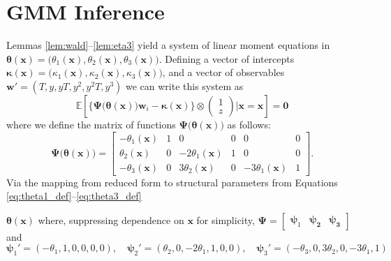 \section{GMM Inference}
\label{sec:inference}

Lemmas \ref{lem:wald}--\ref{lem:eta3} yield a system of linear moment equations in $\boldsymbol{\theta}(\mathbf{x}) = \big(\theta_1(\mathbf{x}), \theta_2(\mathbf{x}),\theta_3(\mathbf{x})\big)$.
Defining a vector of intercepts $\boldsymbol{\kappa}(\mathbf{x}) = \big(\kappa_1(\mathbf{x}), \kappa_2(\mathbf{x}), \kappa_3(\mathbf{x})\big)$,
and a vector of observables $\mathbf{w}' = (T, y, yT, y^2, y^2 T, y^3)$ we can write this system as
\begin{equation}
\mathbb{E}\left[
  \bigg\{\boldsymbol{\Psi}\big(\boldsymbol{\theta}(\mathbf{x})\big)\mathbf{w}_i - \boldsymbol{\kappa}(\mathbf{x})\bigg\} \otimes 
\left(
\begin{array}{c}
  1 \\ z
\end{array}\right)\Bigg| \mathbf{x} = \boldsymbol{x}
\right] = \mathbf{0}
\label{eq:MCs_endog}
\end{equation}
where we define the matrix of functions $\boldsymbol{\Psi}\big(\boldsymbol{\theta}(\mathbf{x})\big)$ as follows:
\[
  \boldsymbol{\Psi}\big(\boldsymbol{\theta}(\mathbf{x})\big) = 
  \left[
  \begin{array}{rrrrrr}
    -\theta_1(\mathbf{x}) & 1 & 0 & 0 & 0 & 0\\
    \theta_2(\mathbf{x}) & 0 & -2\theta_1(\mathbf{x}) & 1 & 0 & 0\\ 
    -\theta_3(\mathbf{x}) & 0 & 3\theta_2(\mathbf{x}) & 0 & -3\theta_1(\mathbf{x}) & 1
\end{array}\right].
\]
Via the mapping from reduced form to structural parameters from  Equations \ref{eq:theta1_def}--\ref{eq:theta3_def}

$\boldsymbol{\theta}(\mathbf{x})$
where, suppressing dependence on $\mathbf{x}$ for simplicity, $\boldsymbol{\Psi} = \left[
  \begin{array}{ccc}
    \boldsymbol{\psi}_1 & \boldsymbol{\psi_2} & \boldsymbol{\psi_3}
\end{array}\right]$ and
\begin{equation}
  \boldsymbol{\psi}_1' = (-\theta_1, 1, 0, 0, 0, 0), \quad
  \boldsymbol{\psi}_2' = (\theta_2, 0, -2\theta_1, 1, 0, 0), \quad
  \boldsymbol{\psi}_3' = (-\theta_3, 0, 3\theta_2, 0, -3\theta_1, 1)
  \label{eq:psi_def}
\end{equation}



